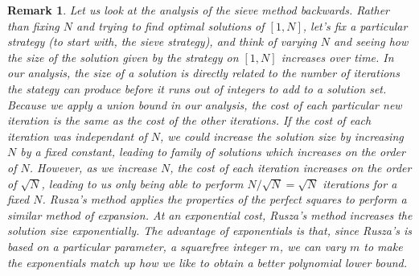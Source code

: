 \documentclass{report}
\theoremstyle{plain}
\theoremstyle{plain}
\newtheorem*{remark}{Remark}
\begin{document}
\begin{remark}
    Let us look at the analysis of the sieve method backwards. Rather than fixing $N$ and trying to find optimal solutions of $[1,N]$, let's fix a particular strategy (to start with, the sieve strategy), and think of varying $N$ and seeing how the size of the solution given by the strategy on $[1,N]$ increases over time. In our analysis, the size of a solution is directly related to the number of iterations the stategy can produce before it runs out of integers to add to a solution set. Because we apply a union bound in our analysis, the cost of each particular new iteration is the same as the cost of the other iterations. If the cost of each iteration was independant of $N$, we could increase the solution size by increasing $N$ by a fixed constant, leading to family of solutions which increases on the order of $N$. However, as we increase $N$, the cost of each iteration increases on the order of $\sqrt{N}$, leading to us only being able to perform $N/\sqrt{N} = \sqrt{N}$ iterations for a fixed $N$. Rusza's method applies the properties of the perfect squares to perform a similar method of expansion. At an exponential cost, Rusza's method increases the solution size exponentially. The advantage of exponentials is that, since Rusza's is based on a particular parameter, a squarefree integer $m$, we can vary $m$ to make the exponentials match up how we like to obtain a better polynomial lower bound.
\end{remark}
\end{document}
